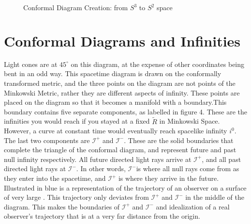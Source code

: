 \documentclass[10pt]{article}
\begin{document}
\begin{figure}[!h]
\begin{tikzpicture}[x=0.75pt,y=0.75pt,yscale=-1,xscale=1]
\end{tikzpicture}
                 \caption{Conformal Diagram Creation: from $S^3$ to $S^2$ space}
                 \label{fig:my_label}
             \end{figure}
             
  \section{Conformal Diagrams and Infinities}\label{sec:class_style}
  Light cones are at $45^\circ$ on this diagram, at the expense of other coordinates being bent in an odd way. This spacetime diagram is drawn on the conformally transformed metric, and the three points on the diagram are not points of the Minkowski Metric, rather they are different aspects of infinity. These points are placed on the diagram so that it becomes a manifold with a boundary.\newline This boundary contains five separate components, as labelled in figure 4. These are the infinities you would reach if you stayed at a fixed $\widetilde{R}$ in Minkowski Space. However, a curve at constant time would eventually reach spacelike infinity $i^0$. The last two components are $  \mathscr{I^+}$ and $  \mathscr{I^-}$. These are the solid boundaries that complete the triangle of the conformal diagram, and represent future and past null infinity respectively. All future directed light rays arrive at $  \mathscr{I^+}$, and all past directed light rays at $  \mathscr{I^-}$. In other words, $  \mathscr{I^-}$is where all null rays come from as they enter into the spacetime, and  $  \mathscr{I^+}$ is where they arrive in the future. \newline Illustrated in blue is a representation of the trajectory of an observer on a surface of very large . This trajectory only deviates from $  \mathscr{I^+}$ and $  \mathscr{I^-}$ in the middle of the diagram. This makes the boundaries of $  \mathscr{I^+}$ and $  \mathscr{I^-}$ and idealization of a real observer's trajectory that is at a very far distance from the origin.
  
\end{document}

